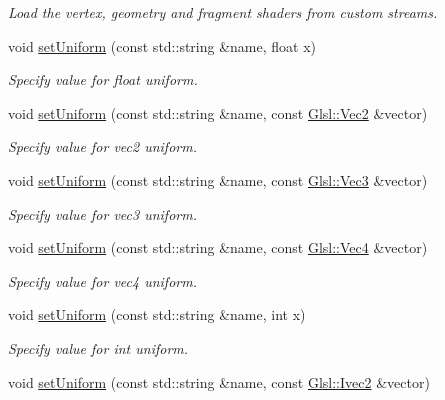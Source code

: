 \begin{DoxyCompactItemize}
\begin{DoxyCompactList}\small\item\em Load the vertex, geometry and fragment shaders from custom streams. \end{DoxyCompactList}\item 
void \hyperlink{classsf_1_1_shader_abf78e3bea1e9b0bab850b6b0a0de29c7}{set\+Uniform} (const std\+::string \&name, float x)
\begin{DoxyCompactList}\small\item\em Specify value for {\ttfamily float} uniform. \end{DoxyCompactList}\item 
void \hyperlink{classsf_1_1_shader_a4a2c673c41e37b17d67e4af1298b679f}{set\+Uniform} (const std\+::string \&name, const \hyperlink{namespacesf_1_1_glsl_adeed356d346d87634b4c197a530e4edf}{Glsl\+::\+Vec2} \&vector)
\begin{DoxyCompactList}\small\item\em Specify value for {\ttfamily vec2} uniform. \end{DoxyCompactList}\item 
void \hyperlink{classsf_1_1_shader_aad654ad8de6f0c56191fa7b8cea21db2}{set\+Uniform} (const std\+::string \&name, const \hyperlink{namespacesf_1_1_glsl_a9bdd0463b7cb5316244a082007bd50f0}{Glsl\+::\+Vec3} \&vector)
\begin{DoxyCompactList}\small\item\em Specify value for {\ttfamily vec3} uniform. \end{DoxyCompactList}\item 
void \hyperlink{classsf_1_1_shader_abc1aee8343800680fd62e1f3d43c24bf}{set\+Uniform} (const std\+::string \&name, const \hyperlink{structsf_1_1priv_1_1_vector4}{Glsl\+::\+Vec4} \&vector)
\begin{DoxyCompactList}\small\item\em Specify value for {\ttfamily vec4} uniform. \end{DoxyCompactList}\item 
void \hyperlink{classsf_1_1_shader_ae4fc8b4c18e6b653952bce5c8c81e4a0}{set\+Uniform} (const std\+::string \&name, int x)
\begin{DoxyCompactList}\small\item\em Specify value for {\ttfamily int} uniform. \end{DoxyCompactList}\item 
void \hyperlink{classsf_1_1_shader_a2ccb5bae59cedc7d6a9b533c97f7d1ed}{set\+Uniform} (const std\+::string \&name, const \hyperlink{namespacesf_1_1_glsl_aab803ee70c4b7bfcd63ec09e10408fd3}{Glsl\+::\+Ivec2} \&vector)

\end{DoxyCompactItemize}
